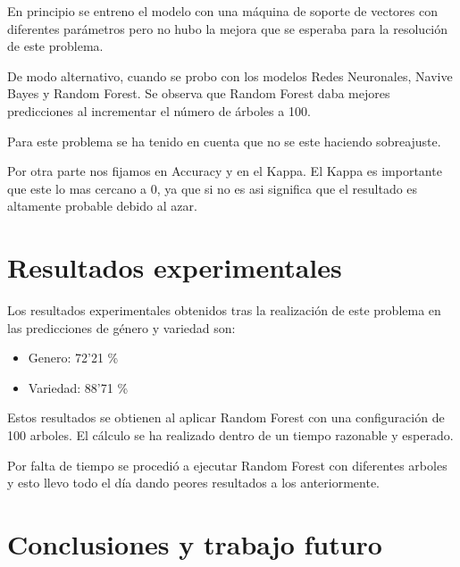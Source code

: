 \documentclass[11pt,a4paper]{article}
\begin{document}
En principio se entreno el modelo con una
m\'aquina de soporte de vectores con diferentes par\'ametros pero no hubo la mejora que se esperaba para la resolución de este problema.

De modo alternativo, cuando se probo con los modelos Redes Neuronales, Navive Bayes y Random Forest. Se observa que Random Forest daba mejores predicciones al incrementar el n\'umero de \'arboles a 100.

Para este problema se ha tenido en cuenta que no se este haciendo sobreajuste.

Por otra parte nos fijamos en Accuracy y en el Kappa. El Kappa es importante que este lo mas cercano a 0, ya que si no es asi significa que el resultado es altamente probable debido al azar.


\section{Resultados experimentales}

Los resultados experimentales obtenidos tras la realizaci\'on de este problema en las
predicciones de género y variedad son:
  \begin{itemize}
  \item Genero: 72'21 \%
  \item Variedad: 88'71 \%
  \end{itemize}

Estos resultados se obtienen al aplicar Random Forest con una configuraci\'on de 100 arboles. El c\'alculo se ha realizado dentro de un tiempo razonable y esperado.

Por falta de tiempo se procedi\'o a ejecutar Random Forest con diferentes arboles y esto llevo todo el d\'ia dando peores resultados a los anteriormente.


\section{Conclusiones y trabajo futuro}
\end{document}
